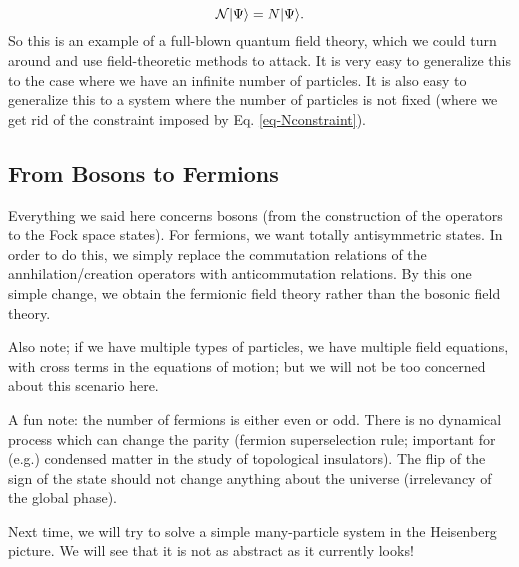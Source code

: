 \begin{equation}\label{eq-Nconstraint}
    \mathcal{N}\lvert \Psi \rangle = N\lvert \Psi \rangle.
\end{equation}
So this is an example of a full-blown quantum field theory, which we could turn around and use field-theoretic methods to attack. It is very easy to generalize this to the case where we have an infinite number of particles. It is also easy to generalize this to a system where the number of particles is not fixed (where we get rid of the constraint imposed by Eq. \eqref{eq-Nconstraint}).

\subsection{From Bosons to Fermions}
Everything we said here concerns bosons (from the construction of the operators to the Fock space states). For fermions, we want totally antisymmetric states. In order to do this, we simply replace the commutation relations of the annhilation/creation operators with anticommutation relations. By this one simple change, we obtain the fermionic field theory rather than the bosonic field theory.

Also note; if we have multiple types of particles, we have multiple field equations, with cross terms in the equations of motion; but we will not be too concerned about this scenario here.

A fun note: the number of fermions is either even or odd. There is no dynamical process which can change the parity (fermion superselection rule; important for (e.g.) condensed matter in the study of topological insulators). The flip of the sign of the state should not change anything about the universe (irrelevancy of the global phase).

Next time, we will try to solve a simple many-particle system in the Heisenberg picture. We will see that it is not as abstract as it currently looks!